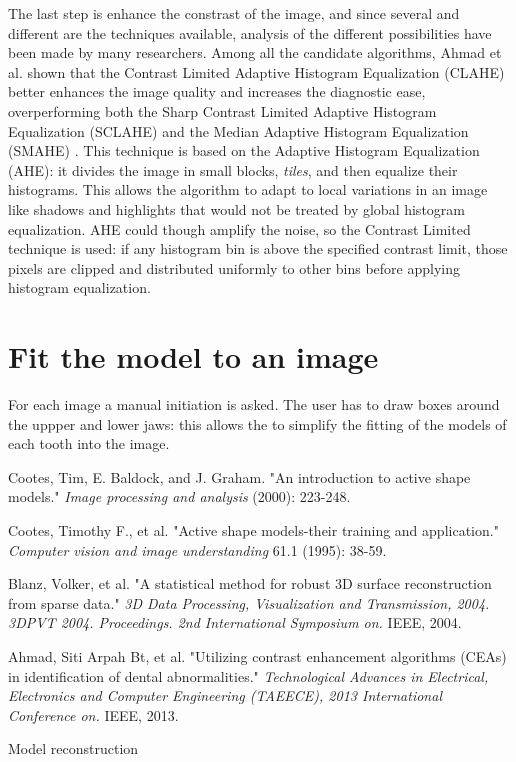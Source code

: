 \documentclass[a4paper]{article}
\begin{document}
The last step is enhance the constrast of the image, and since several and different are the techniques available, analysis of the different possibilities have been made by many researchers. Among all the candidate algorithms, Ahmad et al. shown that the Contrast Limited Adaptive Histogram Equalization (CLAHE) better enhances the image quality and increases the diagnostic ease, overperforming both the Sharp Contrast Limited Adaptive Histogram Equalization (SCLAHE) and the Median Adaptive Histogram Equalization (SMAHE) \cite{ahmad}. This technique is based on the Adaptive Histogram Equalization (AHE): it divides the image in small blocks, \textit{tiles}, and then equalize their histograms. This allows the algorithm to adapt to local variations in an image like shadows and highlights that would not be treated by global histogram equalization. AHE could though amplify the noise, so the Contrast Limited technique is used: if any histogram bin is above the specified contrast limit, those pixels are clipped and distributed uniformly to other bins before applying histogram equalization.

\section{Fit the model to an image}
For each image a manual initiation is asked. The user has to draw boxes around the uppper and lower jaws: this allows the to simplify the fitting of the models of each tooth into the image. 

\begin{thebibliography}{99}

 Cootes, Tim, E. Baldock, and J. Graham. "An introduction to active shape models." \textit{Image processing and analysis} (2000): 223-248.

 Cootes, Timothy F., et al. "Active shape models-their training and application." \textit{Computer vision and image understanding} 61.1 (1995): 38-59.

 Blanz, Volker, et al. "A statistical method for robust 3D surface reconstruction from sparse data." \textit{3D Data Processing, Visualization and Transmission, 2004. 3DPVT 2004. Proceedings. 2nd International Symposium on.} IEEE, 2004.

 Ahmad, Siti Arpah Bt, et al. "Utilizing contrast enhancement algorithms (CEAs) in identification of dental abnormalities." \textit{Technological Advances in Electrical, Electronics and Computer Engineering (TAEECE), 2013 International Conference on.} IEEE, 2013.

Model reconstruction 

% 

\end{thebibliography}
\end{document}
